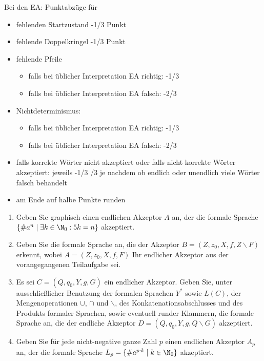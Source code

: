 \documentclass[12pt]{article}
\begin{document}
\begin{loesung}
  \begin{korrektur}
    Bei den EA: Punktabzüge für
    \begin{itemize}
    \item fehlenden Startzustand -1/3 Punkt
    \item fehlende Doppelkringel -1/3 Punkt
    \item fehlende Pfeile
      \begin{itemize}
      \item falls bei üblicher Interpretation EA richtig: -1/3
      \item falls bei üblicher Interpretation EA falsch: -2/3
      \end{itemize}
    \item Nichtdeterminismus: 
      \begin{itemize}
      \item falls bei üblicher Interpretation EA richtig: -1/3
      \item falls bei üblicher Interpretation EA falsch: -2/3
      \end{itemize}
    \item falls korrekte Wörter nicht akzeptiert oder falls nicht
      korrekte Wörter akzeptiert: jeweils -1/3 /3 je nachdem ob
      endlich oder unendlich viele Wörter falsch behandelt
    \item am Ende auf halbe Punkte runden
    \end{itemize}
  \end{korrektur}
\end{loesung}


\begin{aufgabe}[2 + 1 + 1 + 3 = 7]
  \begin{enumerate}
    \item Geben Sie graphisch einen endlichen Akzeptor $A$ an, der die formale Sprache $\{\#a^n \mid \exists k \in \N_0 : 5 k = n\}$ akzeptiert.
    \item Geben Sie die formale Sprache an, die der Akzeptor $B = (Z, z_0, X, f, Z \smallsetminus F)$ erkennt, wobei $A = (Z, z_0, X, f, F)$ Ihr endlicher Akzeptor aus der vorangegangenen Teilaufgabe sei.
    \item Es sei $C = (Q, q_0, Y, g, G)$ ein endlicher Akzeptor. Geben Sie, unter ausschließlicher Benutzung der formalen Sprachen $Y^*$ sowie $L(C)$, der Mengenoperationen $\cup$, $\cap$ und $\smallsetminus$, des Konkatenationsabschlusses und des Produkts formaler Sprachen, sowie eventuell runder Klammern, die formale Sprache an, die der endliche Akzeptor $D = (Q, q_0, Y, g, Q \smallsetminus G)$ akzeptiert.
    \item Geben Sie für jede nicht-negative ganze Zahl $p$ einen endlichen Akzeptor $A_p$ an, der die formale Sprache $L_p = \{\#a^{p \cdot k} \mid k \in \N_0\}$ akzeptiert.
  \end{enumerate}
\end{aufgabe}
\end{document}
